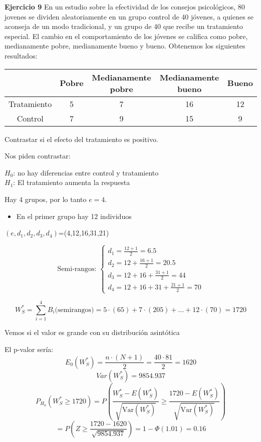 \textbf{Ejercicio 9}
En un  estudio sobre la efectividad de los consejos psicológicos, 80 jovenes se dividen aleatoriamente en un grupo control de 40 jóvenes, a quienes se aconseja de un modo tradicional, y un grupo de 40 que recibe un tratamiento especial. El cambio en el comportamiento de los jóvenes se califica como pobre, medianamente pobre, medianamente bueno y bueno. Obtenemos los siguientes resultados:
\begin{table}[h!]
    \centering
    \begin{tabular}{|c|c|c|c|c|}
    \hline
    & Pobre & Medianamente pobre & Medianamente bueno & Bueno \\ \hline
    Tratamiento & 5 & 7 & 16 & 12 \\ \hline
    Control     & 7 & 9 & 15 & 9  \\ \hline
    \end{tabular}
\end{table}

\newpage

Contrastar si el efecto del tratamiento es positivo.

Nos piden contrastar:

\begin{center}
    $H_0$: no hay diferencias entre control y tratamiento \\
    $H_1$: El tratamiento aumenta la respuesta
\end{center}

Hay 4 grupos, por lo tanto $e=4$.

\begin{itemize}
    \item En el primer grupo hay 12 individuos
\end{itemize}

$(e,d_1,d_2,d_3,d_4)$=(4,12,16,31,21)

\[
\text{Semi-rangos: }
\left\{
\begin{matrix}
    d_1=\frac{12+1}{2}=6.5 \\
    d_2=12+\frac{16+1}{2}=20.5 \\
    d_3=12+16+\frac{31+1}{2}=44 \\
    d_4=12+16+31+\frac{21+1}{2}=70
\end{matrix}
\right.
\]

\[
    W_S^*=\sum_{i=1}^{4} B_i \text{(semirangos)}=5\cdot (65)+ 7\cdot (205)+ \dots+12 \cdot (70)=1720
\]

Vemos si el valor es grande con su distribución asintótica

El p-valor sería:
\[
    E_0(W_S^*) = \frac{n \cdot (N+1)}{2} = \frac{40 \cdot 81}{2} = 1620
\]
\[
    Var(W_S^*) = 9854.937
\]
\[
    P_{H_0}(W_S^* \geq 1720) = P \left( \frac{W_S^* - E(W_S^*)}{\sqrt{\text{Var}(W_S^*)}} \geq \frac{1720 - E(W_S^*)}{\sqrt{\text{Var}(W_S^*)}} \right)
\]
\[
    = P \left(Z \geq \frac{1720 - 1620}{\sqrt{9854.937}} \right) = 1 - \Phi(1.01) = 0.16
\]
